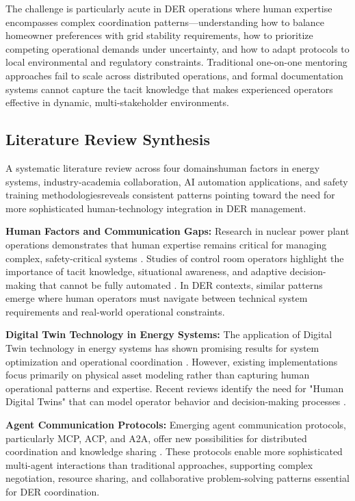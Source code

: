 \documentclass[12pt,a4paper]{article}
\newcommand{\emdash}{\textemdash}
\begin{document}
The challenge is particularly acute in DER operations where human expertise encompasses complex coordination patterns—understanding how to balance homeowner preferences with grid stability requirements, how to prioritize competing operational demands under uncertainty, and how to adapt protocols to local environmental and regulatory constraints. Traditional one-on-one mentoring approaches fail to scale across distributed operations, and formal documentation systems cannot capture the tacit knowledge that makes experienced operators effective in dynamic, multi-stakeholder environments.

\subsection{Literature Review Synthesis}

A systematic literature review across four domains\emdash{}human factors in energy systems, industry-academia collaboration, AI automation applications, and safety training methodologies\emdash{}reveals consistent patterns pointing toward the need for more sophisticated human-technology integration in DER management.

\textbf{Human Factors and Communication Gaps:} Research in nuclear power plant operations demonstrates that human expertise remains critical for managing complex, safety-critical systems \cite{10.1108/13552510610654510}. Studies of control room operators highlight the importance of tacit knowledge, situational awareness, and adaptive decision-making that cannot be fully automated \cite{10.1049/OAP-CIRED.2017.1107}. In DER contexts, similar patterns emerge where human operators must navigate between technical system requirements and real-world operational constraints.

\textbf{Digital Twin Technology in Energy Systems:} The application of Digital Twin technology in energy systems has shown promising results for system optimization and operational coordination \cite{10.1016/j.esr.2024.101334}. However, existing implementations focus primarily on physical asset modeling rather than capturing human operational patterns and expertise. Recent reviews identify the need for "Human Digital Twins" that can model operator behavior and decision-making processes \cite{10.1109/ETFA61755.2024.10711109}.

\textbf{Agent Communication Protocols:} Emerging agent communication protocols, particularly MCP, ACP, and A2A, offer new possibilities for distributed coordination and knowledge sharing \cite{10.5220/0001894702000205}. These protocols enable more sophisticated multi-agent interactions than traditional approaches, supporting complex negotiation, resource sharing, and collaborative problem-solving patterns essential for DER coordination.
\end{document}
